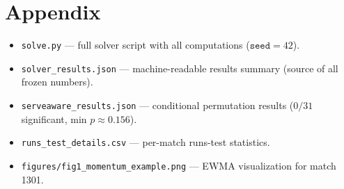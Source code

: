 \documentclass[11pt,a4paper]{article}
\begin{document}
\appendix
\section{Appendix}
\begin{itemize}
  \item \texttt{solve.py} --- full solver script with all computations ($\texttt{seed}=42$).
  \item \texttt{solver\_results.json} --- machine-readable results summary (source of all frozen numbers).
  \item \texttt{serveaware\_results.json} --- conditional permutation results ($0/31$ significant, min $p \approx 0.156$).
  \item \texttt{runs\_test\_details.csv} --- per-match runs-test statistics.
  \item \texttt{figures/fig1\_momentum\_example.png} --- EWMA visualization for match 1301.
\end{itemize}
\end{document}
